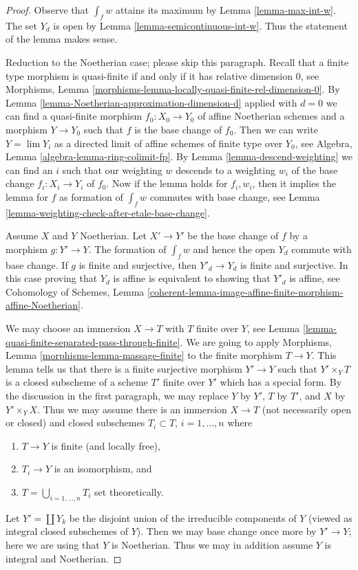 \begin{proof}
Observe that $\int_f w$ attains its maximum by Lemma \ref{lemma-max-int-w}.
The set $Y_d$ is open by Lemma \ref{lemma-semicontinuous-int-w}.
Thus the statement of the lemma makes sense.

\medskip\noindent
Reduction to the Noetherian case; please skip this paragraph.
Recall that a finite type morphism is quasi-finite if and only
if it has relative dimension $0$, see
Morphisms, Lemma \ref{morphisms-lemma-locally-quasi-finite-rel-dimension-0}.
By Lemma \ref{lemma-Noetherian-approximation-dimension-d}
applied with $d = 0$ we can find a quasi-finite morphism $f_0 : X_0 \to Y_0$
of affine Noetherian schemes and a morphism $Y \to Y_0$ such that $f$
is the base change of $f_0$. Then we can write $Y = \lim Y_i$ as a directed
limit of affine schemes of finite type over $Y_0$, see
Algebra, Lemma \ref{algebra-lemma-ring-colimit-fp}.
By Lemma \ref{lemma-descend-weighting}
we can find an $i$ such that our weighting $w$
descends to a weighting $w_i$ of the base change $f_i : X_i \to Y_i$
of $f_0$. Now if the lemma holds for $f_i, w_i$, then it implies
the lemma for $f$ as formation of $\int_f w$ commutes with base
change, see Lemma \ref{lemma-weighting-check-after-etale-base-change}.

\medskip\noindent
Assume $X$ and $Y$ Noetherian. Let $X' \to Y'$ be the base change of $f$
by a morphism $g : Y' \to Y$. The formation of $\int_f w$ and hence
the open $Y_d$ commute with base change. If $g$ is finite and surjective, then
$Y'_d \to Y_d$ is finite and surjective. In this case proving that
$Y_d$ is affine is equivalent to showing that $Y'_d$ is affine, see
Cohomology of Schemes, Lemma
\ref{coherent-lemma-image-affine-finite-morphism-affine-Noetherian}.

\medskip\noindent
We may choose an immersion $X \to T$ with $T$ finite over $Y$, see Lemma
\ref{lemma-quasi-finite-separated-pass-through-finite}.
We are going to apply Morphisms, Lemma \ref{morphisms-lemma-massage-finite}
to the finite morphism $T \to Y$. This lemma tells us that
there is a finite surjective morphism $Y' \to Y$ such that
$Y' \times_Y T$ is a closed subscheme of a scheme $T'$ finite over $Y'$
which has a special form.
By the discussion in the first paragraph, we may replace $Y$ by $Y'$,
$T$ by $T'$, and $X$ by $Y' \times_Y X$.
Thus we may assume there is an immersion $X \to T$ (not necessarily
open or closed) and closed subschemes
$T_i \subset T$, $i = 1, \ldots, n$ where
\begin{enumerate}
\item $T \to Y$ is finite (and locally free),
\item $T_i \to Y$ is an isomorphism, and
\item $T = \bigcup_{i = 1, \ldots, n} T_i$ set theoretically.
\end{enumerate}
Let $Y' = \coprod Y_k$ be the disjoint union of the irreducible
components of $Y$ (viewed as integral closed subschemes of $Y$).
Then we may base change once more by $Y' \to Y$; here we
are using that $Y$ is Noetherian. Thus we may in
addition assume $Y$ is integral and Noetherian.


\end{proof}
